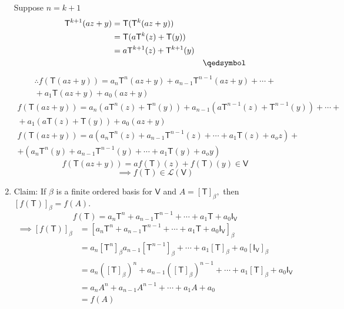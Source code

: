 \begin{enumerate}
Suppose $n=k+1$
\begin{align}
\mathsf{T}^{k+1}(az+y) &= \mathsf{T}(\mathsf{T}^k(az+y))\\
&= \mathsf{T}(a\mathsf{T}^k(z) + \mathsf{T}(y))\\
&= a\mathsf{T}^{k+1}(z) + \mathsf{T}^{k+1}(y) \\ & & \qedsymbol\notag
\end{align}
\begin{multline}
\therefore f(\mathsf{T}(az+y)) = a_n\mathsf{T}^n(az+y)
+a_{n-1}\mathsf{T}^{n-1}(az+y) +\dotsb + \\  {}+a_1\mathsf{T}(az +y) +
a_0(az+y)
\end{multline}
\begin{multline}
f(\mathsf{T}(az+y)) = a_n(a\mathsf{T}^n(z) + \mathsf{T}^n(y)) +
a_{n-1}(a\mathsf{T}^{n-1}(z) +\mathsf{T}^{n-1}(y)) + \dotsb + \\ {} +
a_1(a\mathsf{T}(z) +\mathsf{T}(y)) +a_0(az +y)
\end{multline}
\begin{multline}
f(\mathsf{T}(az+y)) = a(a_n\mathsf{T}^n(z)+a_{n-1}\mathsf{T}^{n-1}(z)
+ \dotsb + a_1\mathsf{T}(z) +a_oz) + \\
+ (a_n\mathsf{T}^n(y)+a_{n-1}\mathsf{T}^{n-1}(y)
+ \dotsb + a_1\mathsf{T}(y) +a_oy)
\end{multline}
\begin{equation}
f(\mathsf{T}(az+y)) = af(\mathsf{T})(z) + f(\mathsf{T})(y) \in \mathsf{V}
\end{equation}
\begin{equation}
\implies f(\mathsf{T}) \in \mathcal{L}(\mathsf{V})
\end{equation}
\item Claim: If $\beta$ is a finite ordered basis for $\mathsf{V}$ and
  $A=[\mathsf{T}]_\beta,$ then $\left[f(\mathsf{T})\right]_\beta = f(A).$
\begin{equation}
f(\mathsf{T}) = a_n\mathsf{T}^n +a_{n-1}\mathsf{T}^{n-1}+\dotsb
+a_1\mathsf{T} +a_0\mathsf{I}_\mathsf{V}
\end{equation}
\begin{align}
\implies\left[f(\mathsf{T})\right]_\beta &= \left[a_n\mathsf{T}^n +a_{n-1}\mathsf{T}^{n-1}+\dotsb
+a_1\mathsf{T} +a_0\mathsf{I}_\mathsf{V}\right]_\beta\\
&= a_n\left[\mathsf{T}^n\right]_\beta
a_{n-1}\left[\mathsf{T}^{n-1}\right]_\beta + \dotsb +
a_1\left[\mathsf{T}\right]_\beta
  +a_0\left[\mathsf{I}_\mathsf{V}\right]_\beta\\
&= a_n\left(\left[\mathsf{T}\right]_\beta\right)^n
+a_{n-1}\left(\left[\mathsf{T}\right]_\beta\right)^{n-1} + \dotsb +
a_1\left[\mathsf{T}\right]_\beta + a_0\mathsf{I}_\mathsf{V}\\
&= a_nA^n +a_{n-1}A^{n-1} +\dotsb + a_1A +a_0\\
&= f(A)
\end{align}
\end{enumerate}
